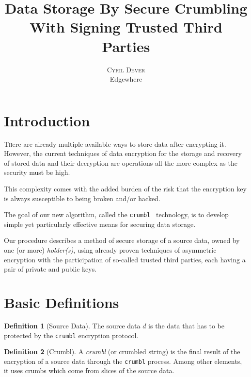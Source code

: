 \documentclass[twoside,twocolumn]{article}
\title{Data Storage By Secure Crumbling \\With Signing Trusted Third Parties} %
\author{%
    \textsc{Cyril Dever}\\ %
    \normalsize Edgewhere \\ %
}
\date{\DTMusedate{thedate}}
\renewcommand{\thefootnote}{\arabic{footnote}}
\theoremstyle{definition}
\newtheorem{definition}{Definition}
\theoremstyle{remark}
\begin{document}
\maketitle

{\renewcommand{\thefootnote}{\fnsymbol{footnote}} }


\section{Introduction}

\lettrine[nindent=0em,lines=3]{T}here are already multiple available ways to store data after encrypting it. However, the current techniques of data 
encryption for the storage and recovery of stored data and their decryption are operations all the more complex as the security must be high.

This complexity comes with the added burden of the risk that the encryption key is always susceptible to being broken and/or hacked.

The goal of our new algorithm, called the \texttt{crumbl}\texttrademark~ technology, is to develop simple yet particularly effective means for securing 
data storage.

Our procedure describes a method of secure storage of a source data, owned by one (or more) \emph{holder(s)}, using already proven techniques of 
asymmetric encryption with the participation of so-called trusted third parties, each having a pair of private and public keys.


\section{Basic Definitions}

\begin{definition}[Source Data]
    \label{sourceData}
    The source data $d$ is the data that has to be protected by the \texttt{crumbl} encryption protocol.
\end{definition}

\begin{definition}[Crumbl]
    \label{crumbl}
    A \emph{crumbl} (or crumbled string) is the final result of the encryption of a source data through the \texttt{crumbl} process.
    Among other elements, it uses crumbs which come from slices of the source data.
\end{definition}
\end{document}
